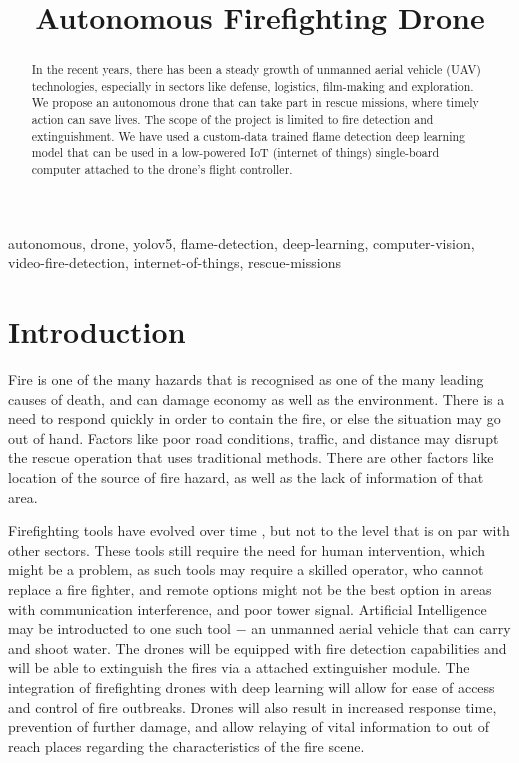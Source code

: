\documentclass[conference]{IEEEtran}
\begin{document}
\title{Autonomous Firefighting Drone}

\author{
}

\maketitle

\begin{abstract}
In the recent years, there has been a steady growth of unmanned aerial vehicle (UAV) technologies, especially in sectors like defense, logistics, film-making and exploration.
We propose an autonomous drone that can take part in rescue missions, where timely action can save lives. The scope of the project is limited to fire detection and extinguishment. We have used a custom-data trained flame detection deep learning model that can be used in a low-powered IoT (internet of things) single-board computer attached to the drone's flight controller.
\end{abstract}

\begin{IEEEkeywords}
autonomous, drone, yolov5, flame-detection, deep-learning, computer-vision, video-fire-detection, internet-of-things, rescue-missions
\end{IEEEkeywords}

\section{Introduction}
Fire is one of the many hazards that is recognised as one of the many leading causes of death, and can damage economy as well as the environment\cite{b1, b2, b3, b4}. There is a need to respond quickly in order to contain the fire, or else the situation may go out of hand. Factors like poor road conditions, traffic, and distance may disrupt the rescue operation that uses traditional methods. There are other factors like location of the source of fire hazard, as well as the lack of information of that area.

Firefighting tools have evolved over time \cite{b5}, but not to the level that is on par with other sectors. These tools still require the need for human intervention, which might be a problem, as such tools may require a skilled operator, who cannot replace a fire fighter, and remote options might not be the best option in areas with communication interference, and poor tower signal. Artificial Intelligence may be introducted to one such tool $-$ an unmanned aerial vehicle that can carry and shoot water. The drones will be equipped with fire detection capabilities and will be able to extinguish the fires via a attached extinguisher module.  The integration of firefighting drones with deep learning will allow for ease of access and control of fire outbreaks. Drones will also result in increased response time, prevention of further damage, and allow relaying of vital information to out of reach places regarding the characteristics of the fire scene.
\end{document}
